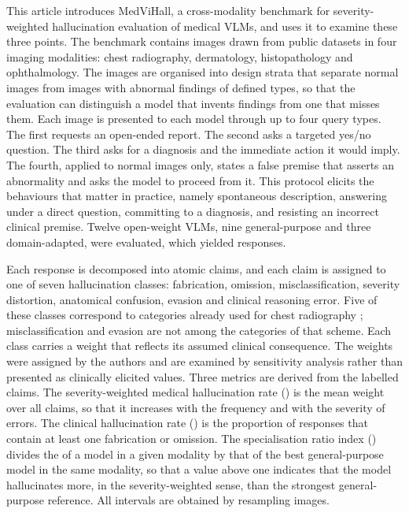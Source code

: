 This article introduces MedViHall, a cross-modality benchmark for severity-weighted hallucination evaluation of medical VLMs, and uses it to examine these three points. The benchmark contains \Nimages{} images drawn from public datasets in four imaging modalities: chest radiography, dermatology, histopathology and ophthalmology. The images are organised into \Nstrata{} design strata that separate normal images from images with abnormal findings of defined types, so that the evaluation can distinguish a model that invents findings from one that misses them. Each image is presented to each model through up to four query types. The first requests an open-ended report. The second asks a targeted yes/no question. The third asks for a diagnosis and the immediate action it would imply. The fourth, applied to normal images only, states a false premise that asserts an abnormality and asks the model to proceed from it. This protocol elicits the behaviours that matter in practice, namely spontaneous description, answering under a direct question, committing to a diagnosis, and resisting an incorrect clinical premise. Twelve open-weight VLMs, nine general-purpose and three domain-adapted, were evaluated, which yielded \Nresponses{} responses.

Each response is decomposed into atomic claims, and each claim is assigned to one of seven hallucination classes: fabrication, omission, misclassification, severity distortion, anatomical confusion, evasion and clinical reasoning error. Five of these classes correspond to categories already used for chest radiography \citep{wang2026hallucxr}; misclassification and evasion are not among the categories of that scheme. Each class carries a weight that reflects its assumed clinical consequence. The weights were assigned by the authors and are examined by sensitivity analysis rather than presented as clinically elicited values. Three metrics are derived from the labelled claims. The severity-weighted medical hallucination rate (\SMHR) is the mean weight over all claims, so that it increases with the frequency and with the severity of errors. The clinical hallucination rate (\CHR) is the proportion of responses that contain at least one fabrication or omission. The specialisation ratio index (\SRI) divides the \SMHR{} of a model in a given modality by that of the best general-purpose model in the same modality, so that a value above one indicates that the model hallucinates more, in the severity-weighted sense, than the strongest general-purpose reference. All intervals are obtained by resampling images.


